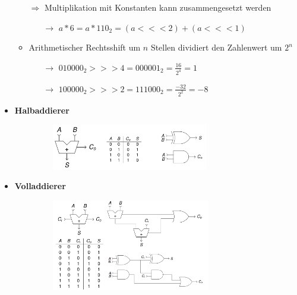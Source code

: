 \documentclass[11pt,a4paper]{article}
\begin{document}
\begin{itemize}
\begin{itemize}
	\item[$\Rightarrow$] Multiplikation mit Konstanten kann zusammengesetzt werden
		\begin{itemize}
		\item[$\rightarrow$] $a * 6 = a* 110_2 = (a <<< 2) + (a <<< 1)$
		\end{itemize}
	
	\item Arithmetischer Rechtsshift um $n$ Stellen dividiert den Zahlenwert um $2^n$
		\begin{itemize}
		\item[$\rightarrow$] $010000_2 >>> 4 = 000001_2 = \frac{16}{2^4} = 1$
		\item[$\rightarrow$] $100000_2 >>> 2 = 111000_2 = \frac{-32}{2^2} = -8$
		\end{itemize}
		
	\end{itemize}

\item \textbf{Halbaddierer}
	\begin{itemize}
	\item[]
		\begin{figure}[H]
			\begin{center}
			\includegraphics[height=2cm]{halbaddierer}
			\end{center}
		\end{figure}
	\end{itemize}
	
\item \textbf{Volladdierer}
	\begin{itemize}
	\item[]
		\begin{figure}[H]
			\begin{center}
			\includegraphics[height=4cm]{volladdierer}
			\end{center}
		\end{figure}
	\end{itemize}


\end{itemize}
\end{document}
